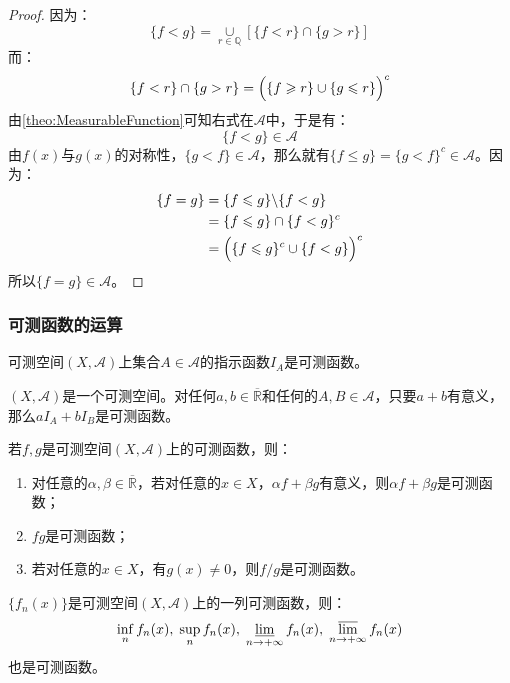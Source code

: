 \begin{proof}
	因为：
	\begin{equation*}
		\{f<g\}=\underset{r\in\mathbb{Q}}{\overset{}{\cup}}[\{f<r\}\cap\{g>r\}]
	\end{equation*}
	而：
	\begin{equation*}
		\{f<r\}\cap\{g>r\}=\Bigl(\{f\geqslant r\}\cup\{g\leqslant r\}\Bigr)^c
	\end{equation*}
	由\cref{theo:MeasurableFunction}可知右式在$\mathscr{A}$中，于是有：
	\begin{equation*}
		\{f<g\}\in\mathscr{A}
	\end{equation*}
	由$f(x)$与$g(x)$的对称性，$\{g<f\}\in\mathscr{A}$，那么就有$\{f\leqslant g\}=\{g<f\}^c\in\mathscr{A}$。因为：
	\begin{align*}
		\{f=g\}
		&=\{f\leqslant g\}\backslash\{f<g\} \\
		&=\{f\leqslant g\}\cap\{f<g\}^c \\
		&=\Bigl(\{f\leqslant g\}^c\cup\{f<g\}\Bigr)^c
	\end{align*}
	所以$\{f=g\}\in\mathscr{A}$。
\end{proof}
\subsubsection{可测函数的运算}
\begin{theorem}\label{theo:IMeasurable}
	可测空间$(X,\mathscr{A})$上集合$A\in\mathscr{A}$的指示函数$I_A$是可测函数。
\end{theorem}
\begin{lemma}
	$(X,\mathscr{A})$是一个可测空间。对任何$a,b\in\overline{\mathbb{R}}$和任何的$A,B\in\mathscr{A}$，只要$a+b$有意义，那么$aI_A+bI_B$是可测函数。
\end{lemma}
\begin{theorem}\label{theo:MeasurableFunctionOperate}
	若$f,g$是可测空间$(X,\mathscr{A})$上的可测函数，则：
	\begin{enumerate}
		\item 对任意的$\alpha,\beta\in\overline{\mathbb{R}}$，若对任意的$x\in X$，$\alpha f+\beta g$有意义，则$\alpha f+\beta g$是可测函数；
		\item $fg$是可测函数；
		\item 若对任意的$x\in X$，有$g(x)\ne0$，则$f/g$是可测函数。
	\end{enumerate}
\end{theorem}
\begin{theorem}\label{theo:MeasurableFunctionSeqMeasurable}
	$\{f_n(x)\}$是可测空间$(X,\mathscr{A})$上的一列可测函数，则：
	\begin{equation*}
		\inf_nf_n(x),\;\sup_nf_n(x),\;
		\varliminf_{n\to+\infty}f_n(x),\;\varlimsup_{n\to+\infty}f_n(x)
	\end{equation*}
	也是可测函数。
\end{theorem}
